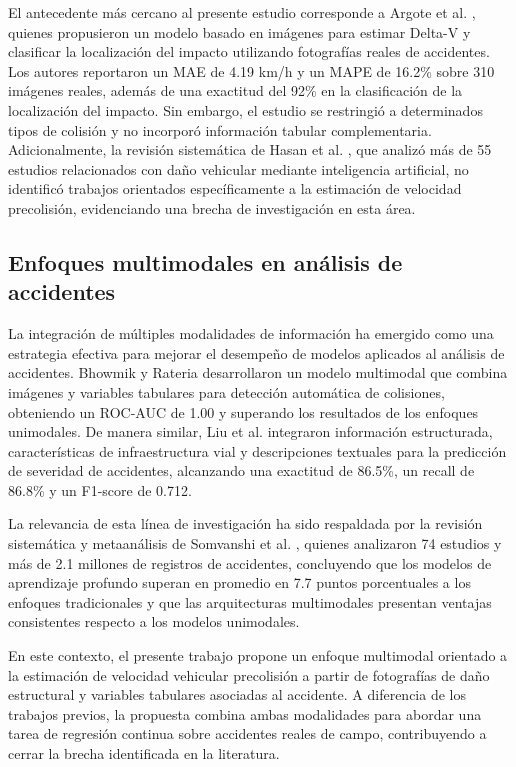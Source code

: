 \documentclass[esp]{SpeedEstimationAI_paper}
\begin{document}
El antecedente más cercano al presente estudio corresponde a Argote et al. \cite{Argote2022}, quienes propusieron un modelo basado en imágenes para estimar Delta-V y clasificar la localización del impacto utilizando fotografías reales de accidentes. Los autores reportaron un MAE de 4.19 km/h y un MAPE de 16.2\% sobre 310 imágenes reales, además de una exactitud del 92\% en la clasificación de la localización del impacto. Sin embargo, el estudio se restringió a determinados tipos de colisión y no incorporó información tabular complementaria. Adicionalmente, la revisión sistemática de Hasan et al. \cite{Hasan2025}, que analizó más de 55 estudios relacionados con daño vehicular mediante inteligencia artificial, no identificó trabajos orientados específicamente a la estimación de velocidad precolisión, evidenciando una brecha de investigación en esta área.

\subsection{Enfoques multimodales en análisis de accidentes}

La integración de múltiples modalidades de información ha emergido como una estrategia efectiva para mejorar el desempeño de modelos aplicados al análisis de accidentes. Bhowmik y Rateria \cite{Bhowmik2023} desarrollaron un modelo multimodal que combina imágenes y variables tabulares para detección automática de colisiones, obteniendo un ROC-AUC de 1.00 y superando los resultados de los enfoques unimodales. De manera similar, Liu et al. \cite{Liu2025} integraron información estructurada, características de infraestructura vial y descripciones textuales para la predicción de severidad de accidentes, alcanzando una exactitud de 86.5\%, un recall de 86.8\% y un F1-score de 0.712.

La relevancia de esta línea de investigación ha sido respaldada por la revisión sistemática y metaanálisis de Somvanshi et al. \cite{Somvanshi2026}, quienes analizaron 74 estudios y más de 2.1 millones de registros de accidentes, concluyendo que los modelos de aprendizaje profundo superan en promedio en 7.7 puntos porcentuales a los enfoques tradicionales y que las arquitecturas multimodales presentan ventajas consistentes respecto a los modelos unimodales.

En este contexto, el presente trabajo propone un enfoque multimodal orientado a la estimación de velocidad vehicular precolisión a partir de fotografías de daño estructural y variables tabulares asociadas al accidente. A diferencia de los trabajos previos, la propuesta combina ambas modalidades para abordar una tarea de regresión continua sobre accidentes reales de campo, contribuyendo a cerrar la brecha identificada en la literatura.
\end{document}
